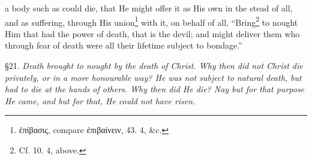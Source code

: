 a body such as could die, that He might offer it as His own in the stead of all, and as suffering, through His union\footnote{\textgreek{ἐπίβασις}, compare \textgreek{ἐπιβαίνειν}, 43. 4, \&c.} with it, on behalf of all, “Bring\footnote{Cf. 10. 4, above.} to nought Him that had the power of death, that is the devil; and might deliver them who through fear of death were all their lifetime subject to bondage.”


§21. \emph{Death brought to nought by the death of Christ. Why then did not Christ die privately, or in a more honourable way? He was not subject to natural death, but had to die at the hands of others. Why then did He die? Nay but for that purpose He came, and but for that, He could not have risen.}

